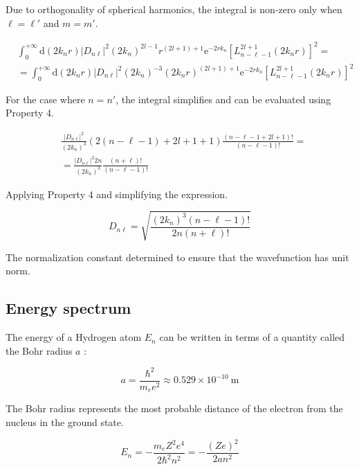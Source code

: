 \documentclass[italian]{HKNdocument}
\begin{document}
Due to orthogonality of spherical harmonics, the integral is non-zero only when $\ell=\ell'$ and $m=m'$.

\begin{align}
& \int_{0}^{+\infty} \mathrm{d}\left(2 k_{n} r\right)\left|D_{n \ell}\right|^{2}\left(2 k_{n}\right)^{2 l-1} r^{(2 l+1)+1} \mathrm{e}^{-2 r k_{n}}\left[L_{n-\ell-1}^{2 l+1}\left(2 k_{n} r\right)\right]^{2}= \\
& =\int_{0}^{+\infty} \mathrm{d}\left(2 k_{n} r\right)\left|D_{n \ell}\right|^{2}\left(2 k_{n}\right)^{-3}\left(2 k_{n} r\right)^{(2 l+1)+1} \mathrm{e}^{-2 r k_{n}}\left[L_{n-\ell-1}^{2 l+1}\left(2 k_{n} r\right)\right]^{2} \label{eq:9.82}
\end{align}

For the case where $n=n'$, the integral simplifies and can be evaluated using Property 4.

\begin{align}
& \frac{\left|D_{n \ell}\right|^{2}}{\left(2 k_{n}\right)^{3}}(2(n-\ell-1)+2 l+1+1) \frac{(n-\ell-1+2 l+1)!}{(n-\ell-1)!}=  \label{eq:9.83}\\
& =\frac{\left|D_{n \ell}\right|^{2} 2 n}{\left(2 k_{n}\right)^{3}} \frac{(n+\ell)!}{(n-\ell-1)!}
\end{align}

Applying Property 4 and simplifying the expression.

\begin{equation}
D_{n \ell}=\sqrt{\frac{\left(2 k_{n}\right)^{3}(n-\ell-1)!}{2 n(n+\ell)!}} \label{eq:9.84}
\end{equation}

The normalization constant determined to ensure that the wavefunction has unit norm.

\subsection{Energy spectrum}
The energy of a Hydrogen atom $E_{n}$ can be written in terms of a quantity called the Bohr radius $a$ :

\begin{equation}
a=\frac{\hbar^{2}}{m_{e} e^{2}} \approx 0.529 \times 10^{-10} \mathrm{~m} \label{eq:9.85}
\end{equation}

The Bohr radius represents the most probable distance of the electron from the nucleus in the ground state.

\begin{equation}
E_{n}=-\frac{m_{e} Z^{2} e^{4}}{2 \hbar^{2} n^{2}}=-\frac{(Z e)^{2}}{2 a n^{2}} \label{eq:9.86}
\end{equation}
\end{document}
